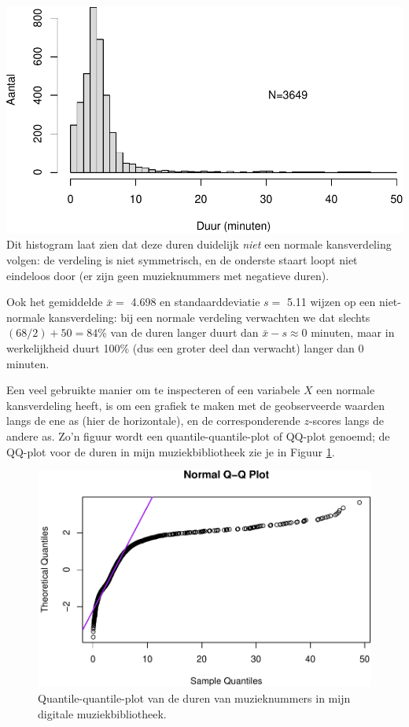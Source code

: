 \documentclass[
]{book}
\begin{document}
\includegraphics{MS1NL-boek_files/figure-latex/itunestimeshist-1.pdf}
Dit histogram laat zien dat deze duren
duidelijk \emph{niet} een normale kansverdeling volgen: de verdeling is niet
symmetrisch, en de onderste staart loopt niet eindeloos door (er zijn
geen muzieknummers met negatieve duren).

Ook het gemiddelde \(\bar{x} =\) 4.698 en
standaarddeviatie \(s =\) 5.11
wijzen op een niet-normale kansverdeling:
bij een normale verdeling verwachten we dat slechts \((68/2)+50=84\)\% van de duren langer duurt dan
\(\bar{x}-s\approx 0\) minuten, maar in werkelijkheid duurt 100\%
(dus een groter deel dan verwacht) langer dan 0 minuten.

Een veel gebruikte manier om te inspecteren of een variabele \(X\) een
normale kansverdeling heeft, is om een grafiek te maken met de
geobserveerde waarden langs de ene as (hier de horizontale), en de corresponderende \(z\)-scores
langs de andere as. Zo'n figuur wordt een quantile-quantile-plot of
QQ-plot genoemd; de QQ-plot voor de duren in mijn muziekbibliotheek zie
je in Figuur \ref{fig:itunestimesqqplot}.

\begin{figure}
\centering
\includegraphics{MS1NL-boek_files/figure-latex/itunestimesqqplot-1.pdf}
\caption{\label{fig:itunestimesqqplot}Quantile-quantile-plot van de duren van muzieknummers in mijn digitale muziekbibliotheek.}
\end{figure}
\end{document}
